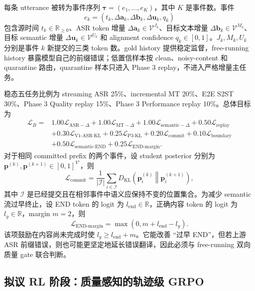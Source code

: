 \documentclass[11pt,a4paper]{article}
\newcommand{\vect}[1]{\bm{#1}}
\newcommand{\R}{\mathbb{R}}
\newcommand{\Vocab}{\mathcal{V}}
\newcommand{\Loss}{\mathcal{L}}
\newcommand{\KL}{D_{\mathrm{KL}}}
\begin{document}
每条 utterance 被转为事件序列 $\vect{\tau}=(e_1,\ldots,e_K)$，其中 $K$ 是事件数。事件
\begin{equation}
 e_k=(t_k,\Delta\vect{a}_k,\Delta\vect{b}_k,
 \Delta\vect{u}_k,q_k)
 \label{eq:event}
\end{equation}
包含源时间 $t_k\in\R_{\ge0}$、ASR token 增量 $\Delta\vect{a}_k\in\Vocab^{J_k}$、目标文本增量 $\Delta\vect{b}_k\in\Vocab^{M_k}$、目标 semantic 增量 $\Delta\vect{u}_k\in\Vocab^{U_k}$ 和 alignment confidence $q_k\in[0,1]$。$J_k,M_k,U_k$ 分别是事件 $k$ 新提交的三类 token 数。gold history 提供稳定监督，free-running history 暴露模型自己的前缀错误；低置信样本按 clean、noisy-content 和 quarantine 路由，quarantine 样本只进入 Phase 3 replay，不进入严格增量主任务。

稳态五任务比例为 streaming ASR 25\%、incremental MT 20\%、E2E S2ST 30\%、Phase 3 Quality replay 15\%、Phase 3 Performance replay 10\%。总体目标为
\begin{align}
 \Loss_B={}&1.00\Loss_{\mathrm{ASR}-\Delta}
 +1.00\Loss_{\mathrm{MT}-\Delta}
 +1.00\Loss_{\mathrm{semantic}-\Delta}
 +0.50\Loss_{\mathrm{replay}}\nonumber\\
 &+0.30\Loss_{\mathrm{V1\text{-}ASR\text{-}KL}}
 +0.25\Loss_{\mathrm{P3\text{-}KL}}
 +0.20\Loss_{\mathrm{commit}}
 +0.10\Loss_{\mathrm{boundary}}\nonumber\\
 &+0.50\Loss_{\mathrm{semantic\text{-}END}}
 +0.25\Loss_{\mathrm{END\text{-}margin}}.
 \label{eq:stageb}
\end{align}
对于相同 committed prefix 的两个事件，设 student posterior 分别为 $\vect{p}^{(k)},\vect{p}^{(k+1)}\in[0,1]^{V'}$，则
\begin{equation}
 \Loss_{\mathrm{commit}}=
 \frac{1}{|\mathcal{I}|}\sum_{i\in\mathcal{I}}
 \KL\!\left(\vect{p}^{(k)}_i\middle\|\vect{p}^{(k+1)}_i\right),
 \label{eq:commitkl}
\end{equation}
其中 $\mathcal{I}$ 是已经提交且在相邻事件中语义应保持不变的位置集合。为减少 semantic 流过早终止，设 END token 的 logit 为 $l_{\mathrm{end}}\in\R$，正确内容 token 的 logit 为 $l_{y}\in\R$，margin $m=2$，则
\begin{equation}
 \Loss_{\mathrm{END\text{-}margin}}
 =\max\left(0,m+l_{\mathrm{end}}-l_y\right).
 \label{eq:endmargin}
\end{equation}
该项鼓励在内容尚未完成时使 $l_y\ge l_{\mathrm{end}}+m$。它能改善 ``过早 END''，但若上游 ASR 前缀错误，则也可能更坚定地延长错误翻译，因此必须与 free-running 双向质量 gate 联合判断。

\subsection{拟议 RL 阶段：质量感知的轨迹级 GRPO}
\end{document}
